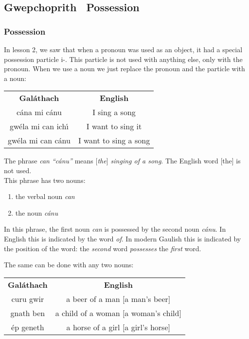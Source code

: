 \subsection{Gwepchoprith \textendash\ Possession}
\subsubsection{Possession}

In lesson 2, we saw that when a pronoun was used as an object, it had a special possession particle i-. This particle is not used with anything else, only with the pronoun. When we use a noun we just replace the pronoun and the particle with a noun:

\begin{table}[H]
\centering
\begin{tabular}{cc}
  \toprule
  \textbf{Gal\'{a}thach} & \textbf{English}\\
  \cmidrule(lr){1-1}\cmidrule(lr){2-2}
  c\'{a}na mi c\'{a}nu & I sing a song\\
  gw\'{e}la mi can ich\'{\i} & I want to sing it\\
  gw\'{e}la mi can c\'{a}nu & I want to sing a song\\
  \bottomrule
\end{tabular}
\label{examples_possession_particle_when_using_noun}
\end{table}

The phrase \textit{can ``c\'{a}nu''} means \textit{$[$the$]$ singing of a song}. The English word $[$the$]$ is not used.\\

This phrase has two nouns:
\begin{enumerate}
 \item{the verbal noun \textit{can}}
 \item{the noun \textit{c\'{a}nu}}
\end{enumerate}
In this phrase, the first noun \textit{can} is possessed by the second noun \textit{c\'{a}nu}. In English this is indicated by the word \textit{of}. In modern Gaulish this is indicated by the position of the word: the \textit{second} word \textit{possesses} the \textit{first} word.

The same can be done with any two nouns:
\begin{table}[H]
\centering
\begin{tabular}{cc}
  \toprule
  \textbf{Gal\'{a}thach} & \textbf{English}\\
  \cmidrule(lr){1-1}\cmidrule(lr){2-2}
  curu gwir & a beer of a man $[$a man's beer$]$\\
  gnath ben & a child of a woman $[$a woman's child$]$\\
  \'{e}p geneth & a horse of a girl $[$a girl's horse$]$\\
  \bottomrule
\end{tabular}
\label{examples_possession_word_position}
\end{table}

